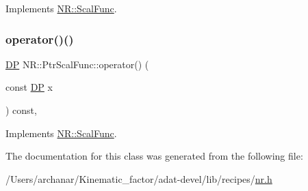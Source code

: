 Implements \mbox{\hyperlink{classNR_1_1ScalFunc_a7dae30ac413c03bb0acfae13b7abb57e}{N\+R\+::\+Scal\+Func}}.

\mbox{\label{classNR_1_1PtrScalFunc_a661b2194b67e1e0e0de15389f0cea5f1}} 
\subsubsection{\texorpdfstring{operator()()}{operator()()}\hspace{0.1cm}{\footnotesize\ttfamily [3/3]}}
{\footnotesize\ttfamily \mbox{\hyperlink{namespaceNR_af6ff762dd605ff477b8e52387253a02a}{DP}} N\+R\+::\+Ptr\+Scal\+Func\+::operator() (\begin{DoxyParamCaption}\item[{const \mbox{\hyperlink{namespaceNR_af6ff762dd605ff477b8e52387253a02a}{DP}}}]{x }\end{DoxyParamCaption}) const\hspace{0.3cm}{\ttfamily [inline]}, {\ttfamily [virtual]}}



Implements \mbox{\hyperlink{classNR_1_1ScalFunc_a7dae30ac413c03bb0acfae13b7abb57e}{N\+R\+::\+Scal\+Func}}.



The documentation for this class was generated from the following file\+:\begin{DoxyCompactItemize}
\item 
/\+Users/archanar/\+Kinematic\+\_\+factor/adat-\/devel/lib/recipes/\mbox{\hyperlink{adat-devel_2lib_2recipes_2nr_8h}{nr.\+h}}\end{DoxyCompactItemize}
